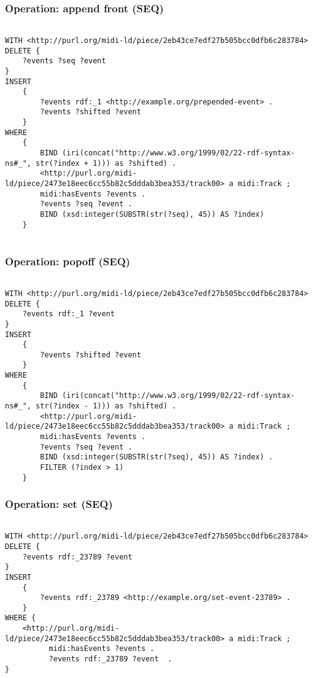 \subsubsection{Operation: append front (SEQ)}
\label{query:SEQ:append_front}

\begin{lstlisting}[language=sparql]

WITH <http://purl.org/midi-ld/piece/2eb43ce7edf27b505bcc0dfb6c283784>
DELETE {
	?events ?seq ?event
}
INSERT
	{ 
		?events rdf:_1 <http://example.org/prepended-event> .
		?events ?shifted ?event
	}
WHERE 
	{  
		BIND (iri(concat("http://www.w3.org/1999/02/22-rdf-syntax-ns#_", str(?index + 1))) as ?shifted) .
		<http://purl.org/midi-ld/piece/2473e18eec6cc55b82c5dddab3bea353/track00> a midi:Track ;
		midi:hasEvents ?events .
		?events ?seq ?event .
		BIND (xsd:integer(SUBSTR(str(?seq), 45)) AS ?index)
	}


\end{lstlisting}

\subsubsection{Operation: popoff (SEQ)}
\label{query:SEQ:popoff}

\begin{lstlisting}[language=sparql]

WITH <http://purl.org/midi-ld/piece/2eb43ce7edf27b505bcc0dfb6c283784>
DELETE {
	?events rdf:_1 ?event
}
INSERT
	{ 
		?events ?shifted ?event
	}
WHERE 
	{  
		BIND (iri(concat("http://www.w3.org/1999/02/22-rdf-syntax-ns#_", str(?index - 1))) as ?shifted) .
		<http://purl.org/midi-ld/piece/2473e18eec6cc55b82c5dddab3bea353/track00> a midi:Track ;
		midi:hasEvents ?events .
		?events ?seq ?event .
		BIND (xsd:integer(SUBSTR(str(?seq), 45)) AS ?index) .
		FILTER (?index > 1)
	}

\end{lstlisting}

\subsubsection{Operation: set (SEQ)}
\label{query:SEQ:set}

\begin{lstlisting}[language=sparql]

WITH <http://purl.org/midi-ld/piece/2eb43ce7edf27b505bcc0dfb6c283784>
DELETE {
	?events rdf:_23789 ?event
}
INSERT
	{ 
		?events rdf:_23789 <http://example.org/set-event-23789> .
	}
WHERE {
    <http://purl.org/midi-ld/piece/2473e18eec6cc55b82c5dddab3bea353/track00> a midi:Track ;
          midi:hasEvents ?events . 
		  ?events rdf:_23789 ?event  .
}

\end{lstlisting}

